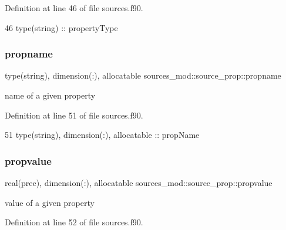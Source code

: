 Definition at line 46 of file sources.\+f90.


\begin{DoxyCode}
46         \textcolor{keywordtype}{type}(string) :: propertyType
\end{DoxyCode}
\mbox{\label{structsources__mod_1_1source__prop_a2f979ab9110ca8df63e276a2a04d5002}} 
\subsubsection{\texorpdfstring{propname}{propname}}
{\footnotesize\ttfamily type(string), dimension(\+:), allocatable sources\+\_\+mod\+::source\+\_\+prop\+::propname\hspace{0.3cm}{\ttfamily [private]}}



name of a given property 



Definition at line 51 of file sources.\+f90.


\begin{DoxyCode}
51         \textcolor{keywordtype}{type}(string), \textcolor{keywordtype}{dimension(:)}, \textcolor{keywordtype}{allocatable} :: propName
\end{DoxyCode}
\mbox{\label{structsources__mod_1_1source__prop_a7d82686562092b327fae70c8f3c89b01}} 
\subsubsection{\texorpdfstring{propvalue}{propvalue}}
{\footnotesize\ttfamily real(prec), dimension(\+:), allocatable sources\+\_\+mod\+::source\+\_\+prop\+::propvalue\hspace{0.3cm}{\ttfamily [private]}}



value of a given property 



Definition at line 52 of file sources.\+f90.


